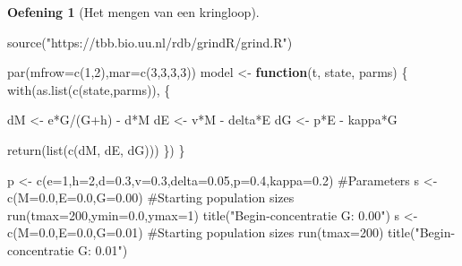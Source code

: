 \documentclass[
  a4paper,
]{scrbook}
\newenvironment{Shaded}{\begin{snugshade}}{\end{snugshade}}
\newcommand{\AttributeTok}[1]{\textcolor[rgb]{0.40,0.45,0.13}{#1}}
\newcommand{\CommentTok}[1]{\textcolor[rgb]{0.37,0.37,0.37}{#1}}
\newcommand{\ControlFlowTok}[1]{\textcolor[rgb]{0.00,0.23,0.31}{\textbf{#1}}}
\newcommand{\DecValTok}[1]{\textcolor[rgb]{0.68,0.00,0.00}{#1}}
\newcommand{\FloatTok}[1]{\textcolor[rgb]{0.68,0.00,0.00}{#1}}
\newcommand{\FunctionTok}[1]{\textcolor[rgb]{0.28,0.35,0.67}{#1}}
\newcommand{\NormalTok}[1]{\textcolor[rgb]{0.00,0.23,0.31}{#1}}
\newcommand{\OtherTok}[1]{\textcolor[rgb]{0.00,0.23,0.31}{#1}}
\newcommand{\SpecialCharTok}[1]{\textcolor[rgb]{0.37,0.37,0.37}{#1}}
\newcommand{\StringTok}[1]{\textcolor[rgb]{0.13,0.47,0.30}{#1}}
\theoremstyle{definition}
\newtheorem{exercise}{Oefening}[chapter]
\theoremstyle{remark}
\begin{document}
\begin{exercise}[Het mengen van een
kringloop]
\begin{Shaded}
\begin{Highlighting}[]
\FunctionTok{source}\NormalTok{(}\StringTok{"https://tbb.bio.uu.nl/rdb/grindR/grind.R"}\NormalTok{)}

\FunctionTok{par}\NormalTok{(}\AttributeTok{mfrow=}\FunctionTok{c}\NormalTok{(}\DecValTok{1}\NormalTok{,}\DecValTok{2}\NormalTok{),}\AttributeTok{mar=}\FunctionTok{c}\NormalTok{(}\DecValTok{3}\NormalTok{,}\DecValTok{3}\NormalTok{,}\DecValTok{3}\NormalTok{,}\DecValTok{3}\NormalTok{))}
\NormalTok{model }\OtherTok{\textless{}{-}} \ControlFlowTok{function}\NormalTok{(t, state, parms) \{}
  \FunctionTok{with}\NormalTok{(}\FunctionTok{as.list}\NormalTok{(}\FunctionTok{c}\NormalTok{(state,parms)), \{ }
    
\NormalTok{    dM }\OtherTok{\textless{}{-}}\NormalTok{ e}\SpecialCharTok{*}\NormalTok{G}\SpecialCharTok{/}\NormalTok{(G}\SpecialCharTok{+}\NormalTok{h) }\SpecialCharTok{{-}}\NormalTok{ d}\SpecialCharTok{*}\NormalTok{M}
\NormalTok{    dE }\OtherTok{\textless{}{-}}\NormalTok{ v}\SpecialCharTok{*}\NormalTok{M }\SpecialCharTok{{-}}\NormalTok{ delta}\SpecialCharTok{*}\NormalTok{E}
\NormalTok{    dG }\OtherTok{\textless{}{-}}\NormalTok{ p}\SpecialCharTok{*}\NormalTok{E }\SpecialCharTok{{-}}\NormalTok{ kappa}\SpecialCharTok{*}\NormalTok{G}
    
    \FunctionTok{return}\NormalTok{(}\FunctionTok{list}\NormalTok{(}\FunctionTok{c}\NormalTok{(dM, dE, dG)))  }
\NormalTok{  \}) }
\NormalTok{\}}

\NormalTok{p }\OtherTok{\textless{}{-}} \FunctionTok{c}\NormalTok{(}\AttributeTok{e=}\DecValTok{1}\NormalTok{,}\AttributeTok{h=}\DecValTok{2}\NormalTok{,}\AttributeTok{d=}\FloatTok{0.3}\NormalTok{,}\AttributeTok{v=}\FloatTok{0.3}\NormalTok{,}\AttributeTok{delta=}\FloatTok{0.05}\NormalTok{,}\AttributeTok{p=}\FloatTok{0.4}\NormalTok{,}\AttributeTok{kappa=}\FloatTok{0.2}\NormalTok{) }\CommentTok{\#Parameters}
\NormalTok{s }\OtherTok{\textless{}{-}} \FunctionTok{c}\NormalTok{(}\AttributeTok{M=}\FloatTok{0.0}\NormalTok{,}\AttributeTok{E=}\FloatTok{0.0}\NormalTok{,}\AttributeTok{G=}\FloatTok{0.00}\NormalTok{) }\CommentTok{\#Starting population sizes}
\FunctionTok{run}\NormalTok{(}\AttributeTok{tmax=}\DecValTok{200}\NormalTok{,}\AttributeTok{ymin=}\FloatTok{0.0}\NormalTok{,}\AttributeTok{ymax=}\DecValTok{1}\NormalTok{) }
\FunctionTok{title}\NormalTok{(}\StringTok{"Begin{-}concentratie G: 0.00"}\NormalTok{)}
\NormalTok{s }\OtherTok{\textless{}{-}} \FunctionTok{c}\NormalTok{(}\AttributeTok{M=}\FloatTok{0.0}\NormalTok{,}\AttributeTok{E=}\FloatTok{0.0}\NormalTok{,}\AttributeTok{G=}\FloatTok{0.01}\NormalTok{) }\CommentTok{\#Starting population sizes}
\FunctionTok{run}\NormalTok{(}\AttributeTok{tmax=}\DecValTok{200}\NormalTok{) }
\FunctionTok{title}\NormalTok{(}\StringTok{"Begin{-}concentratie G: 0.01"}\NormalTok{)}
\end{Highlighting}
\end{Shaded}


\end{exercise}
\end{document}
